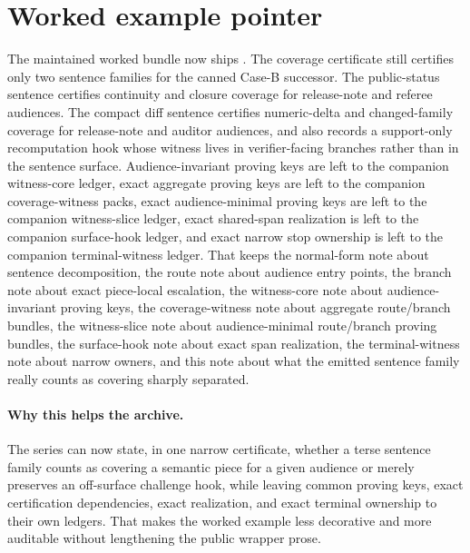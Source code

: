 \documentclass[11pt]{article}
\begin{document}
\section{Worked example pointer}
The maintained worked bundle now ships .\cite{series:workedexample}
The coverage certificate still certifies only two sentence families for the canned Case-B successor.
The public-status sentence certifies continuity and closure coverage for release-note and referee audiences.
The compact diff sentence certifies numeric-delta and changed-family coverage for release-note and auditor audiences, and also records a support-only recomputation hook whose witness lives in verifier-facing branches rather than in the sentence surface.
Audience-invariant proving keys are left to the companion witness-core ledger, exact aggregate proving keys are left to the companion coverage-witness packs, exact audience-minimal proving keys are left to the companion witness-slice ledger, exact shared-span realization is left to the companion surface-hook ledger, and exact narrow stop ownership is left to the companion terminal-witness ledger.
That keeps the normal-form note about sentence decomposition, the route note about audience entry points, the branch note about exact piece-local escalation, the witness-core note about audience-invariant proving keys, the coverage-witness note about aggregate route/branch bundles, the witness-slice note about audience-minimal route/branch proving bundles, the surface-hook note about exact span realization, the terminal-witness note about narrow owners, and this note about what the emitted sentence family really counts as covering sharply separated.\cite{series:downstreamnormalforms,series:challengeroutes,series:challengebranches,series:challengecoveragewitnesscores,series:challengecoveragewitnesspacks,series:challengecoveragewitnessslices,series:challengesurfacehooks,series:challengeterminalwitnesses}

\paragraph{Why this helps the archive.}
The series can now state, in one narrow certificate, whether a terse sentence family counts as covering a semantic piece for a given audience or merely preserves an off-surface challenge hook, while leaving common proving keys, exact certification dependencies, exact realization, and exact terminal ownership to their own ledgers.
That makes the worked example less decorative and more auditable without lengthening the public wrapper prose.
\end{document}
